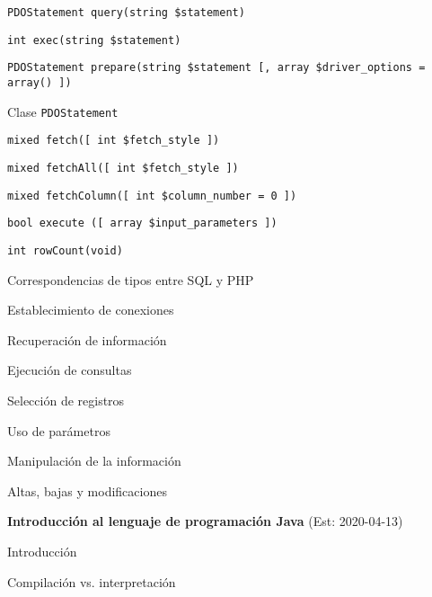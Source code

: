 \begin{longenum}
\begin{longenum}
\begin{longenum}
\begin{longenum}
                \item \texttt{PDOStatement query(string \$statement)}
                \item \texttt{int exec(string \$statement)}
                \item \texttt{PDOStatement prepare(string \$statement [, array \$driver\_options = array() ])}
            \end{longenum}
            \item Clase \texttt{PDOStatement}
            \begin{longenum}
                \item \texttt{mixed fetch([ int \$fetch\_style ])}
                \item \texttt{mixed fetchAll([ int \$fetch\_style ])}
                \item \texttt{mixed fetchColumn([ int \$column\_number = 0 ])}
                \item \texttt{bool execute ([ array \$input\_parameters ])}
                \item \texttt{int rowCount(void)}
            \end{longenum}
            \item Correspondencias de tipos entre SQL y PHP
        \end{longenum}
        \item Establecimiento de conexiones
        \item Recuperación de información
        \begin{longenum}
            \item Ejecución de consultas
            \item Selección de registros
            \item Uso de parámetros
        \end{longenum}
        \item Manipulación de la información
        \begin{longenum}
            \item Altas, bajas y modificaciones
        \end{longenum}
    \end{longenum}
    \item \textbf{Introducción al lenguaje de programación Java}  (Est: 2020-04-13)
    \begin{longenum}
        \item Introducción
        \item Compilación vs. interpretación
        \begin{longenum}

\end{longenum}
\end{longenum}
\end{longenum}
